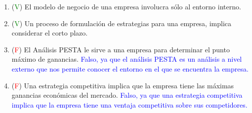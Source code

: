 \documentclass{templateNote}
\begin{document}
\begin{enumerate}
    \item (\textcolor{green}{V}) El modelo de negocio de una empresa involucra sólo al entorno interno.
    \item (\textcolor{green}{V}) Un proceso de formulación de estrategias para una empresa, implica considerar el corto plazo.
    \item (\textcolor{red}{F}) El Análisis PESTA le sirve a una empresa para determinar el punto máximo de ganancias.
    \textcolor{blue}{
        Falso, ya que el análisis PESTA es un análisis a nivel externo que nos permite conocer el entorno en el que se encuentra la empresa.
    }
    \item (\textcolor{red}{F}) Una estrategia competitiva implica que la empresa tiene las máximas ganancias económicas del mercado.\newline
    \textcolor{blue}{
        Falso, ya que una estrategia competitiva implica que la empresa tiene una ventaja competitiva sobre sus competidores.
    }
\end{enumerate}

\newpage
\end{document}
